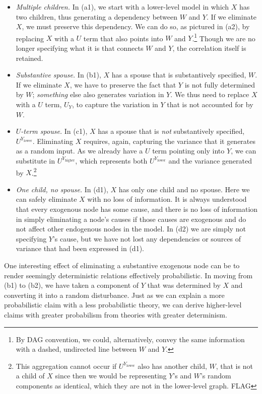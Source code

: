 \documentclass[
  12pt,
]{book}
\providecommand{\tightlist}{%
  \setlength{\itemsep}{0pt}\setlength{\parskip}{0pt}}
\begin{document}
\begin{itemize}
\tightlist
\item
  \emph{Multiple children.} In (a1), we start with a lower-level model in which \(X\) has two children, thus generating a dependency between \(W\) and \(Y\). If we eliminate \(X\), we must preserve this dependency. We can do so, as pictured in (a2), by replacing \(X\) with a \(U\) term that also points into \(W\) and \(Y\).\footnote{By DAG convention, we could, alternatively, convey the same information with a dashed, undirected line between \(W\) and \(Y\).} Though we are no longer specifying what it is that connects \(W\) and \(Y\), the correlation itself is retained.
\item
  \emph{Substantive spouse.} In (b1), \(X\) has a spouse that is substantively specified, \(W\). If we eliminate \(X\), we have to preserve the fact that \(Y\) is not fully determined by \(W\); \emph{something} else also generates variation in \(Y\). We thus need to replace \(X\) with a \(U\) term, \(U_Y\), to capture the variation in \(Y\) that is not accounted for by \(W\).
\item
  \emph{\(U\)-term spouse.} In (c1), \(X\) has a spouse that is \emph{not} substantively specified, \(U^{Y_\text{lower}}\). Eliminating \(X\) requires, again, capturing the variance that it generates as a random input. As we already have a \(U\) term pointing only into \(Y\), we can substitute in \(U^{Y_\text{higher}}\), which represents both \(U^{Y_\text{lower}}\) and the variance generated by \(X\).\footnote{This aggregation cannot occur if \(U^{Y_\text{lower}}\) also has another child, \(W\), that is not a child of \(X\) since then we would be representing \(Y\)'s and \(W\)'s random components as identical, which they are not in the lower-level graph. FLAG}
\item
  \emph{One child, no spouse.} In (d1), \(X\) has only one child and no spouse. Here we can safely eliminate \(X\) with no loss of information. It is always understood that every exogenous node has some cause, and there is no loss of information in simply eliminating a node's causes if those causes are exogenous and do not affect other endogenous nodes in the model. In (d2) we are simply not specifying \(Y\)'s cause, but we have not lost any dependencies or sources of variance that had been expressed in (d1).
\end{itemize}

One interesting effect of eliminating a substantive exogenous node can be to render seemingly deterministic relations effectively probabilistic. In moving from (b1) to (b2), we have taken a component of \(Y\) that was determined by \(X\) and converting it into a random disturbance. Just as we can explain a more probabilistic claim with a less probabilistic theory, we can derive higher-level claims with greater probabilism from theories with greater determinism.
\end{document}
